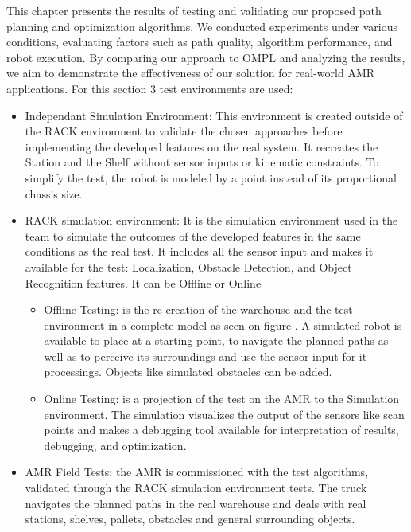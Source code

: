 This chapter presents the results of testing and validating our proposed path planning and optimization algorithms. 
We conducted experiments under various conditions, evaluating factors such as path quality, algorithm 
performance, and robot execution. By comparing our approach to OMPL and analyzing the results, we aim 
to demonstrate the effectiveness of our solution for real-world AMR applications.
For this section 3 test environments are used:
\begin{itemize}
    \item Independant Simulation Environment: This environment is created outside of the RACK 
    environment to validate the chosen approaches before implementing the developed features 
    on the real system. It recreates the Station and the Shelf without sensor inputs or kinematic constraints.
    To simplify the test, the robot is modeled by a point instead of its proportional chassis size.

    \item RACK simulation environment: It is the simulation environment used in the team to simulate 
    the outcomes of the developed features in the same conditions as the real test. It includes all the sensor 
    input and makes it available for the test: Localization, Obstacle Detection, and Object Recognition features.
    It can be Offline or Online
    \begin{itemize}
        \item Offline Testing: is the re-creation of the warehouse and the test environment in a complete model
        as seen on figure . A simulated robot is available to place at a starting point, 
        to navigate the planned paths as well
        as to perceive its surroundings and use the sensor input for it processings. Objects like simulated 
        obstacles can be added. 
        \item Online Testing: is a projection of the test on the AMR to the Simulation environment.
        The simulation visualizes the output of the sensors like scan points and makes a debugging 
        tool available for interpretation of results, debugging, and optimization.
    \end{itemize}

    \item AMR Field Tests: the AMR is commissioned with the test algorithms, validated through the RACK simulation
    environment tests. The truck navigates the planned paths in the real warehouse and deals with real stations, 
    shelves, pallets, obstacles and general surrounding objects.
\end{itemize}

